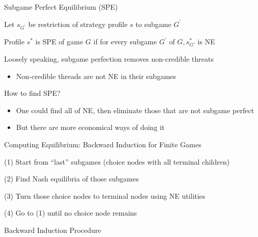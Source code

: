 \documentclass[11pt,aspectratio=169]{beamer}
\begin{document}
  \begin{frame}{Subgame Perfect Equilibrium (SPE)}
   \begin{itemizes}
    \item Let $s_{G^\prime}$ be restriction of strategy profile $s$ to subgame $G^\prime$
    \item Profile $s^*$ is SPE of game $G$ if for \alert{every subgame} $G^\prime$ of $G, s^{*}_{G'}$ is NE
    \item Loosely speaking, subgame perfection \alert{removes non-credible threats}
    \begin{itemize}
     \item Non-credible threads are not NE in their subgames
    \end{itemize}
    \item How to find SPE?
    \begin{itemize}
     \item One could find all of NE, then eliminate those that are not subgame perfect
     \item But there are more economical ways of doing it
    \end{itemize}
   \end{itemizes}
  \end{frame}


  \begin{frame}{Computing Equilibrium: Backward Induction for Finite Games}
   \begin{itemizes}
    \item (1) Start from ``last'' subgames (choice nodes with all terminal children)
    \item (2) Find Nash equilibria of those subgames
    \item (3) Turn those choice nodes to terminal nodes using NE utilities 
    \item (4) Go to (1) until no choice node remains
   \end{itemizes}
  \end{frame}


  \begin{frame}{Backward Induction Procedure}
   \begin{algorithm*}[H]
   \label{alg:BI}
   \caption{Finding value of sample SPE of perfect-info extensive-form game}
   \end{algorithm*}
  \end{frame}
  
\end{document}
